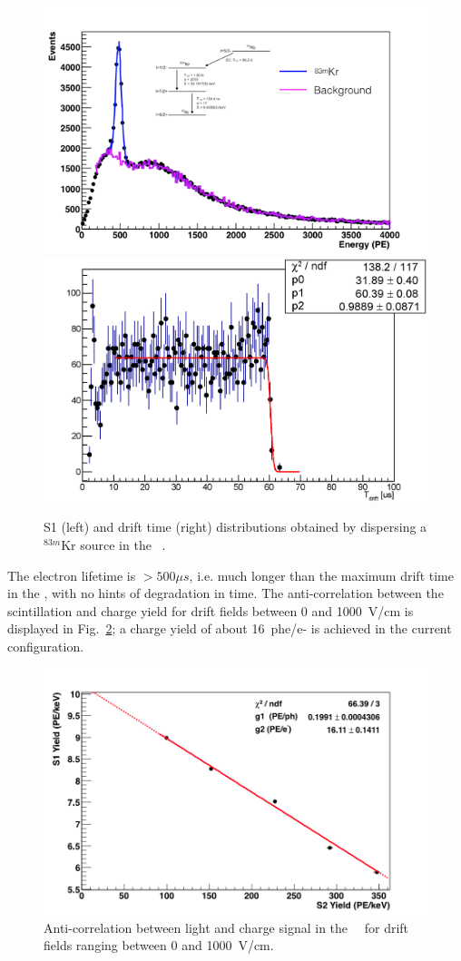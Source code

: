%
\begin{figure}[tbp!]
\centering
\includegraphics[width=0.46\columnwidth]{./Figures/kr_973.png}
\includegraphics[width=0.44\columnwidth]{./Figures/Kr_standardField_TdriftFit.png}
\caption[\ReD\ \TPC\ \SOne\ and drift time with $^{83m}$Kr]{S1 (left) and drift time (right) distributions 
obtained by dispersing a $^{83m}$Kr source in the \ReD\ \TPC.}
\label{fig:ReDUniformity}
\end{figure}
%
The electron lifetime is $> 500 \mu s$, i.e. much longer than the maximum drift time in the \TPC, 
with no hints of degradation in time. The anti-correlation between the scintillation and charge yield 
for drift fields between 0 and 1000~V/cm is displayed in Fig.~\ref{fig:reddoke}; a charge 
yield of about 16~phe/e- is achieved in the current configuration. \\
\begin{figure}[tbp!]
\centering
\includegraphics[width=0.6\columnwidth]{./Figures/asy_s1_s2_finale_s2fitmod_no0.png}
\caption[\SOne-\STwo\ anti-correlation in \ReD]{Anti-correlation between light and charge signal in the 
\ReD\ \TPC\ for drift fields ranging between 0 and 1000~V/cm.}
\label{fig:reddoke}
\end{figure}

